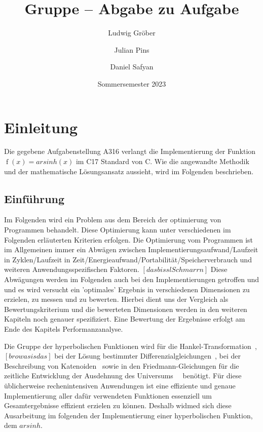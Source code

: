 \documentclass[course=erap] {aspdoc}
\author{Ludwig Gröber \and Julian Pins \and Daniel Safyan}
\date{Sommersemester 2023} %
\title{Gruppe \theGroup{} -- Abgabe zu Aufgabe \theNumber}
\begin{document}
     \maketitle
 
 
     \section{Einleitung}
     Die gegebene Aufgabenstellung A316 verlangt die Implementierung der Funktion $\operatorname{f}(x) = arsinh(x)$ im C17 Standard von C.
     Wie die angewandte Methodik und der mathematische Lösungsansatz aussieht, wird im Folgenden beschrieben.
 
     \subsection{Einführung}
     Im Folgenden wird ein Problem aus dem Bereich der optimierung von Programmen behandelt.
     Diese Optimierung kann unter verschiedenen im Folgenden erläuterten Kriterien erfolgen.
     Die Optimierung vom Programmen ist im Allgemeinen immer ein Abwägen zwischen Implementierungsaufwand/Laufzeit in Zyklen/Laufzeit in Zeit/Energieaufwand/Portabilität/Speicherverbrauch und weiteren Anwendungsspezifischen Faktoren. $[das bissl Schmarrn]$
     Diese Abwägungen werden im Folgenden auch bei den Implementierungen getroffen und und es wird versucht ein 'optimales' Ergebnis in verschiedenen Dimensionen zu erzielen, zu messen und zu bewerten.
     Hierbei dient uns der Vergleich als Bewertungskriterium und die bewerteten Dimensionen werden in den weiteren Kapiteln noch genauer spezifiziert.
     Eine Bewertung der Ergebnisse erfolgt am Ende des Kapitels Performanzanalyse.
 
     Die Gruppe der hyperbolischen Funktionen wird für die Hankel-Transformation~\cite{hankel}, $[bro wasis das]$
     bei der Lösung bestimmter Differenzialgleichungen~\cite{differenzial}, bei der Beschreibung von Katenoiden~\cite{katenoid}
     sowie in den Friedmann-Gleichungen für die zeitliche Entwicklung der Ausdehnung des Universums~\cite{universum1,universum2}~ benötigt. 
     Für diese üblicherweise rechenintensiven Anwendungen ist eine effiziente und genaue Implementierung aller dafür verwendeten Funktionen essenziell um Gesamtergebnisse effizient erzielen zu können.
     Deshalb widmed sich diese Ausarbeitung im folgenden der Implementierung einer hyperbolischen Funktion, dem $arsinh$.
 
\end{document}
